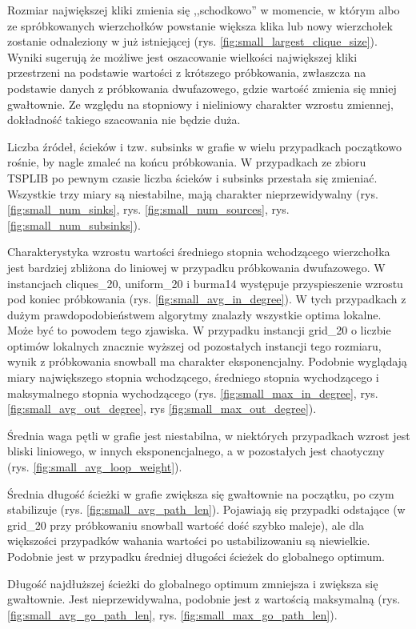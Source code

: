 Rozmiar największej kliki zmienia się ,,schodkowo'' w momencie, w którym albo ze spróbkowanych wierzchołków
powstanie większa klika lub nowy wierzchołek zostanie odnaleziony w już istniejącej (rys. \ref{fig:small_largest_clique_size}).
Wyniki sugerują że możliwe jest oszacowanie wielkości największej kliki przestrzeni na podstawie wartości
z krótszego próbkowania, zwłaszcza na podstawie danych z próbkowania dwufazowego, gdzie
wartość zmienia się mniej gwałtownie. Ze względu na stopniowy i nieliniowy charakter wzrostu zmiennej,
dokładność takiego szacowania nie będzie duża.

Liczba źródeł, ścieków i tzw. subsinks w grafie w wielu przypadkach początkowo rośnie, by nagle zmaleć na końcu próbkowania.
W przypadkach ze zbioru TSPLIB po pewnym czasie liczba ścieków i subsinks przestała się zmieniać.
Wszystkie trzy miary są niestabilne, mają charakter nieprzewidywalny (rys. \ref{fig:small_num_sinks}, rys. \ref{fig:small_num_sources}, rys. \ref{fig:small_num_subsinks}).

Charakterystyka wzrostu wartości średniego stopnia wchodzącego wierzchołka jest bardziej zbliżona do liniowej
w przypadku próbkowania dwufazowego. W instancjach cliques\_20, uniform\_20 i burma14 występuje
przyspieszenie wzrostu pod koniec próbkowania (rys. \ref{fig:small_avg_in_degree}).
W tych przypadkach z dużym prawdopodobieństwem algorytmy znalazły wszystkie optima lokalne.
Może być to powodem tego zjawiska.
W przypadku instancji grid\_20 o liczbie optimów lokalnych znacznie wyższej od pozostałych instancji tego rozmiaru,
wynik z próbkowania snowball ma charakter eksponencjalny.
Podobnie wyglądają miary największego stopnia wchodzącego, średniego stopnia wychodzącego i maksymalnego stopnia wychodzącego
(rys. \ref{fig:small_max_in_degree}, rys. \ref{fig:small_avg_out_degree}, rys \ref{fig:small_max_out_degree}).

Średnia waga pętli w grafie jest niestabilna, w niektórych przypadkach wzrost jest bliski liniowego, w innych
eksponencjalnego, a w pozostałych jest chaotyczny (rys. \ref{fig:small_avg_loop_weight}).

Średnia długość ścieżki w grafie zwiększa się gwałtownie na początku, po czym stabilizuje (rys. \ref{fig:small_avg_path_len}).
Pojawiają się przypadki odstające (w grid\_20 przy próbkowaniu snowball wartość dość szybko maleje),
ale dla większości przypadków wahania wartości po ustabilizowaniu są niewielkie.
Podobnie jest w przypadku średniej długości ścieżek do globalnego optimum.

Długość najdłuższej ścieżki do globalnego optimum zmniejsza i zwiększa się gwałtownie.
Jest nieprzewidywalna, podobnie jest z wartością maksymalną (rys. \ref{fig:small_avg_go_path_len}, rys. \ref{fig:small_max_go_path_len}).

